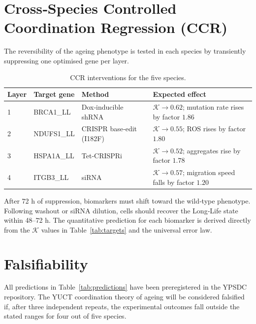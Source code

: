\documentclass[12pt,a4paper]{article}
\newcommand{\REL}{\mathcal{K}}          %
\begin{document}
	\section{Cross‑Species Controlled Coordination Regression (CCR)}
	\label{sec:CCR}
	The reversibility of the ageing phenotype is tested in each species by transiently suppressing one optimised gene per layer.
	
	\begin{table}[H]
		\centering
		\caption{CCR interventions for the five species.}
		\label{tab:CCR}
		\begin{tabular}{@{}llll@{}}
			\toprule
			\textbf{Layer} & \textbf{Target gene} & \textbf{Method} & \textbf{Expected effect} \\
			\midrule
			1 & BRCA1\_LL & Dox‑inducible shRNA & \(\REL \to 0.62\); mutation rate rises by factor \(1.86\) \\
			2 & NDUFS1\_LL & CRISPR base‑edit (I182F) & \(\REL \to 0.55\); ROS rises by factor \(1.80\) \\
			3 & HSPA1A\_LL & Tet‑CRISPRi & \(\REL \to 0.52\); aggregates rise by factor \(1.78\) \\
			4 & ITGB3\_LL & siRNA & \(\REL \to 0.57\); migration speed falls by factor \(1.20\) \\
			\bottomrule
		\end{tabular}
	\end{table}
	
	After 72 h of suppression, biomarkers must shift toward the wild‑type phenotype. Following washout or siRNA dilution, cells should recover the Long‑Life state within 48–72 h. The quantitative prediction for each biomarker is derived directly from the \(\REL\) values in Table~\ref{tab:targets} and the universal error law.
	
	\section{Falsifiability}
	\label{sec:falsifiability}
	All predictions in Table~\ref{tab:predictions} have been preregistered in the YPSDC repository. The YUCT coordination theory of ageing will be considered falsified if, after three independent repeats, the experimental outcomes fall outside the stated ranges for four out of five species.
	
\end{document}
